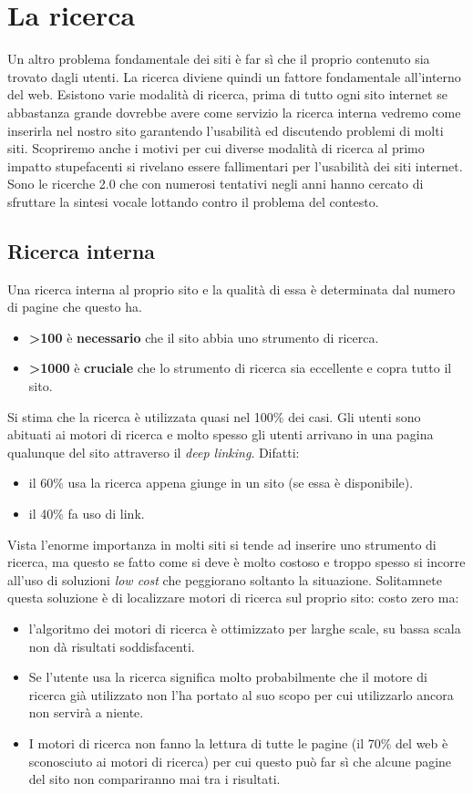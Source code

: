 
\chapter{La ricerca}
	Un altro problema fondamentale dei siti è far sì che il proprio contenuto sia trovato dagli utenti. La ricerca diviene quindi un fattore fondamentale all'interno del web. Esistono varie modalità di ricerca, prima di tutto ogni sito internet se abbastanza grande dovrebbe avere come servizio la ricerca interna vedremo come inserirla nel nostro sito garantendo l'usabilità ed discutendo problemi di molti siti. Scopriremo anche i motivi per cui diverse modalità di ricerca al primo impatto stupefacenti si rivelano essere fallimentari per l'usabilità dei siti internet. Sono le ricerche 2.0 che con numerosi tentativi negli anni hanno cercato di sfruttare la sintesi vocale lottando contro il problema del contesto.

	\section{Ricerca interna}
		Una ricerca interna al proprio sito e la qualità di essa è determinata dal numero di pagine che questo ha.
		\begin{itemize}
			\item \textbf{>100} è \textbf{necessario} che il sito abbia uno strumento di ricerca.
			\item \textbf{>1000} è \textbf{cruciale} che lo strumento di ricerca sia eccellente e copra tutto il sito.
		\end{itemize}
		Si stima che la ricerca è utilizzata quasi nel 100\% dei casi. Gli utenti sono abituati ai motori di ricerca e molto spesso gli utenti arrivano in una pagina qualunque del sito attraverso il \emph{deep linking}. Difatti:
		\begin{itemize}
			\item il 60\% usa la ricerca appena giunge in un sito (se essa è disponibile).
			\item il 40\% fa uso di link.
		\end{itemize}
		
		Vista l'enorme importanza in molti siti si tende ad inserire uno strumento di ricerca, ma questo se fatto come si deve è molto costoso e troppo spesso si incorre all'uso di soluzioni \emph{low cost} che peggiorano soltanto la situazione. Solitamnete questa soluzione è di localizzare motori di ricerca sul proprio sito: costo zero ma:
		\begin{itemize}
			\item l'algoritmo dei motori di ricerca è ottimizzato per larghe scale, su bassa scala non dà risultati soddisfacenti.
			\item Se l'utente usa la ricerca significa molto probabilmente che il motore di ricerca già utilizzato non l'ha portato al suo scopo per cui utilizzarlo ancora non servirà a niente.
			\item I motori di ricerca non fanno la lettura di tutte le pagine (il 70\% del web è sconosciuto ai motori di ricerca) per cui questo può far sì che alcune pagine del sito non compariranno mai tra i risultati.
		\end{itemize}			
	

